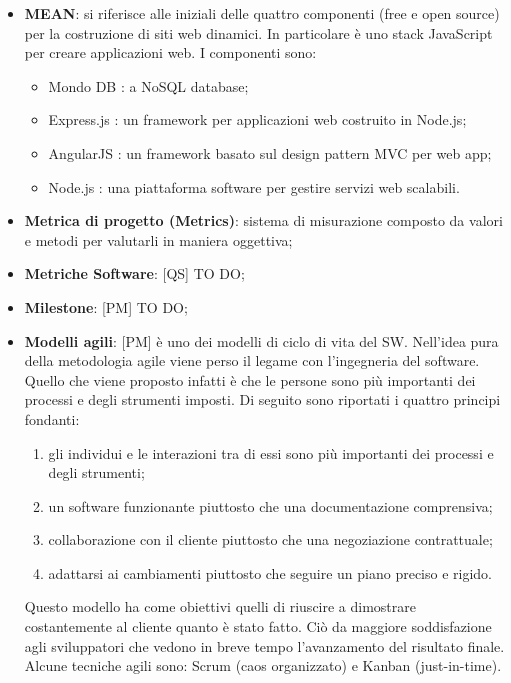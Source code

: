 \begin{itemize}
	\item \textbf{MEAN}: si riferisce alle iniziali delle quattro componenti (free e open source) per la costruzione di siti web dinamici. \newline
In particolare è uno stack JavaScript per creare applicazioni web. \newline
I componenti sono:
	\begin{itemize}
		\item Mondo DB : a NoSQL database;
		\item Express.js : un framework per applicazioni web costruito in Node.js;
		\item AngularJS : un framework basato sul design pattern MVC per web app;
		\item Node.js : una piattaforma software per gestire servizi web scalabili.
	\end{itemize}

	\item \textbf{Metrica di progetto (Metrics)}: sistema di misurazione composto da valori e metodi per valutarli in maniera oggettiva; 

	\item \textbf{Metriche Software}: [QS] TO DO;



	\item \textbf{Milestone}: [PM] TO DO;




	\item \textbf{Modelli agili}: [PM] è uno dei modelli di ciclo di vita del SW. \newline
Nell'idea pura della metodologia agile viene perso il legame con l'ingegneria del software.
Quello che viene proposto infatti è che le persone sono più importanti dei processi e degli strumenti imposti. Di seguito sono riportati i quattro principi fondanti:
		\begin{enumerate}
			\item gli individui e le interazioni tra di essi sono più importanti dei processi e degli strumenti;
			\item un software funzionante piuttosto che una documentazione comprensiva;
			\item collaborazione con il cliente piuttosto che una negoziazione contrattuale;
			\item adattarsi ai cambiamenti piuttosto che seguire un piano preciso e rigido.
		\end{enumerate}
Questo modello ha come obiettivi quelli di riuscire a dimostrare costantemente al cliente quanto è stato fatto. Ciò da maggiore soddisfazione agli sviluppatori che vedono in breve tempo l'avanzamento del risultato finale. \newline
Alcune tecniche agili sono: Scrum (caos organizzato) e Kanban (just-in-time).


\end{itemize}
